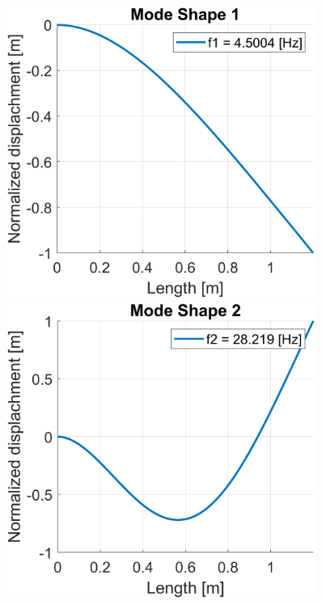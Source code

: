 \begin{figure}[H]
    \begin{minipage}[b]{0.45\textwidth}
        \centering
        \includegraphics[width=0.9\textwidth]{img/MATLAB/Part_A/Mode_shapes/mode_shape_01.png}
    \end{minipage}
    \hfill
    \begin{minipage}[b]{0.45\textwidth}
        \centering
        \includegraphics[width=0.9\textwidth]{img/MATLAB/Part_A/Mode_shapes/mode_shape_02.png}

\end{minipage}
\end{figure}
